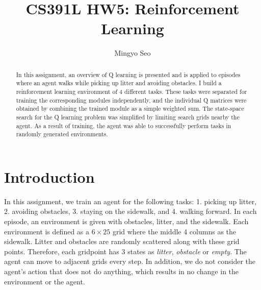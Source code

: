 \documentclass[conference]{IEEEtran}
\begin{document}
\title{CS391L HW5: Reinforcement Learning}

\author{Mingyo Seo}

\author{
}



\maketitle

\IEEEpeerreviewmaketitle

\begin{abstract}

In this assignment, an overview of Q learning is presented and is applied to episodes where an agent walks while picking up litter and avoiding obstacles.
I build a reinforcement learning environment of 4 different tasks.
These tasks were separated for training the corresponding modules independently, and the individual Q matrices were obtained by combining the trained module as a simple weighted sum. 
The state-space search for the Q learning problem was simplified by limiting search grids nearby the agent.
As a result of training, the agent was able to successfully perform tasks in randomly generated environments.
\end{abstract}

\section{Introduction} %

In this assignment, we train an agent for the following tasks: 1. picking up litter, 2. avoiding obstacles, 3. staying on the sidewalk, and 4. walking forward.
In each episode, an environment is given with obstacles, litter, and the sidewalk. 
Each environment is defined as a $6 \times 25$ grid where the middle 4 columns as the sidewalk.
Litter and obstacles are randomly scattered along with these grid points.
Therefore, each gridpoint has 3 states as {\it litter}, {\it obstacle} or {\it empty}.
The agent can move to adjacent grids every step.
In addition, we do not consider the agent's action that does not do anything, which results in no change in the environment or the agent.
\end{document}
